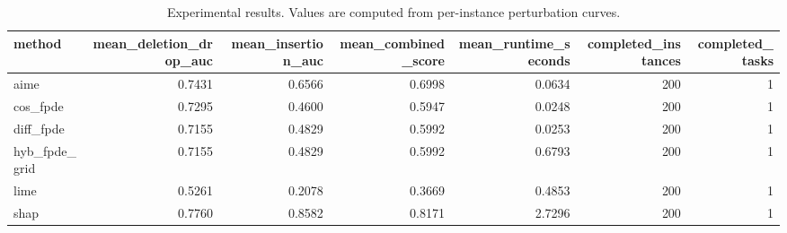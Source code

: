 \begin{table}[t]
\caption{Experimental results. Values are computed from per-instance perturbation curves.}
\label{tab:main_results_computed}
\centering
\begin{tabular}{lrrrrrr}
\toprule
method & mean\_deletion\_drop\_auc & mean\_insertion\_auc & mean\_combined\_score & mean\_runtime\_seconds & completed\_instances & completed\_tasks \\
\midrule
aime & 0.7431 & 0.6566 & 0.6998 & 0.0634 & 200 & 1 \\
cos\_fpde & 0.7295 & 0.4600 & 0.5947 & 0.0248 & 200 & 1 \\
diff\_fpde & 0.7155 & 0.4829 & 0.5992 & 0.0253 & 200 & 1 \\
hyb\_fpde\_grid & 0.7155 & 0.4829 & 0.5992 & 0.6793 & 200 & 1 \\
lime & 0.5261 & 0.2078 & 0.3669 & 0.4853 & 200 & 1 \\
shap & 0.7760 & 0.8582 & 0.8171 & 2.7296 & 200 & 1 \\
\bottomrule
\end{tabular}

\end{table}
